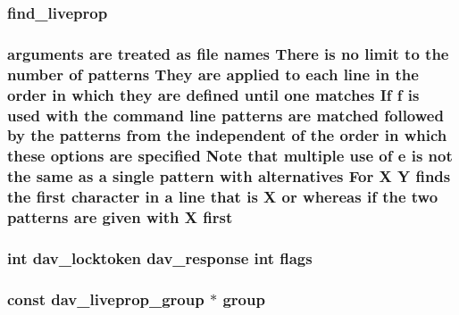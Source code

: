\subsubsection[{\texorpdfstring{find\+\_\+liveprop}{find_liveprop}}]{\setlength{\rightskip}{0pt plus 5cm}find\+\_\+liveprop}\hypertarget{group__MOD__DAV_gaf47594d1c8656da141d16c249230f9bc}{}\label{group__MOD__DAV_gaf47594d1c8656da141d16c249230f9bc}
\subsubsection[{\texorpdfstring{first}{first}}]{ {\bf arguments} {\bf are} treated {\bf as} {\bf file} {\bf names} There {\bf is} no {\bf limit} {\bf to} the {\bf number} {\bf of} {\bf patterns} They {\bf are} applied {\bf to} each {\bf line} {\bf in} the {\bf order} {\bf in} {\bf which} they {\bf are} {\bf defined} until one {\bf matches} If {\bf f} {\bf is} {\bf used} {\bf with} the {\bf command} {\bf line} {\bf patterns} {\bf are} {\bf matched} followed by the {\bf patterns} {\bf from} the independent {\bf of} the {\bf order} {\bf in} {\bf which} these {\bf options} {\bf are} {\bf specified} Note that multiple use {\bf of} {\bf e} {\bf is} {\bf not} the same {\bf as} {\bf a} single {\bf pattern} {\bf with} alternatives For {\bf X} {\bf Y} finds the first {\bf character} {\bf in} {\bf a} {\bf line} that {\bf is} {\bf X} {\bf or} whereas {\bf if} the two {\bf patterns} {\bf are} {\bf given} {\bf with} {\bf X} first}\hypertarget{group__MOD__DAV_gae5e6e8bc4bfa800414992418716f96df}{}\label{group__MOD__DAV_gae5e6e8bc4bfa800414992418716f96df}
\subsubsection[{\texorpdfstring{flags}{flags}}]{ {\bf int} {\bf dav\+\_\+locktoken} {\bf dav\+\_\+response} {\bf int} flags}\hypertarget{group__MOD__DAV_gaf9edd4859daf0078e78e534b424fe4f3}{}\label{group__MOD__DAV_gaf9edd4859daf0078e78e534b424fe4f3}
\subsubsection[{\texorpdfstring{group}{group}}]{\setlength{\rightskip}{0pt plus 5cm}const {\bf dav\+\_\+liveprop\+\_\+group} $\ast$ group}\hypertarget{group__MOD__DAV_gadc3add9d56a1a732c371606682db4c4e}{}\label{group__MOD__DAV_gadc3add9d56a1a732c371606682db4c4e}
